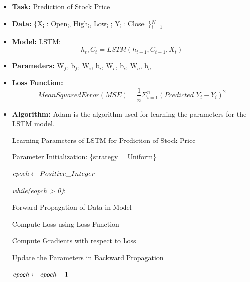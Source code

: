 \begin{itemize}
		
\item \textbf{Task: } Prediction of Stock Price
			
\item \textbf{Data: } \{X\textsubscript{i} : Open\textsubscript{i}, High\textsubscript{i}, Low\textsubscript{i} ; Y\textsubscript{i} : Close\textsubscript{i} \}$_{i =1}^{N}$		%
			
\item \textbf{Model: } LSTM: \begin{equation} h_{t}, C_{t} = LSTM(h_{t-1}, C_{t-1}, X_{t}) \end{equation} 	
			
\item \textbf{Parameters: } W$_{f}$, b$_{f}$, W$_{i}$, b$_{i}$, W$_{c}$,  b$_{c}$, W$_{o}$, b$_{o}$ 

\item \textbf{Loss Function: } \begin{equation}Mean Squared Error (MSE) =  \frac{1}{n}\Sigma_{i=1}^{n} (Predicted\_Y_{i} - Y_{i})^2 \end{equation}

\item \textbf{Algorithm: } Adam is the algorithm used for learning the parameters for the LSTM model.


\begin{algorithm}[H]

\caption{Learning Parameters of LSTM for Prediction of Stock Price}

\begin{algorithmic}[1] 
						
\STATE Parameter Initialization: \{strategy = Uniform\} 

\STATE $\emph{epoch} \gets Positive\_Integer$

\STATE \emph{while(eopch > 0)}:

\STATE \tab	Forward Propagation of Data in Model

\STATE \tab	Compute Loss using Loss Function

\STATE \tab	Compute Gradients with respect to Loss

\STATE \tab	Update the Parameters in Backward Propagation	

\STATE\tab	$\emph{epoch} \gets \emph{epoch}-1$

\end{algorithmic}


\end{algorithm}
\end{itemize}
